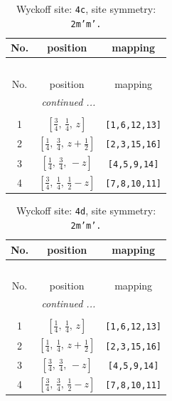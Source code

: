 \documentclass[fleqn,8pt]{jsarticle}
\begin{document}
\renewcommand{\arraystretch}{1.2}
\begin{longtable}{ccc}
\caption{Wyckoff site: {\tt 4c}, site symmetry: {\tt 2m'm'.}}
 \\
 \hline \hline
No. & position & mapping \\ \hline \endfirsthead

\multicolumn{2}{l}{\tablename\ \thetable{}} \\
 \hline \hline
No. & position & mapping \\ \hline \endhead

 \hline \hline
\multicolumn{2}{r}{\footnotesize\it continued ...} \\ \endfoot

 \hline \hline
\multicolumn{2}{r}{} \\ \endlastfoot

1 & $\left[ \frac{3}{4},\, \frac{1}{4},\, z \right]$ & {\tt [1,6,12,13]} \\ \hline
2 & $\left[ \frac{1}{4},\, \frac{3}{4},\, z + \frac{1}{2} \right]$ & {\tt [2,3,15,16]} \\ \hline
3 & $\left[ \frac{1}{4},\, \frac{3}{4},\, - z \right]$ & {\tt [4,5,9,14]} \\ \hline
4 & $\left[ \frac{3}{4},\, \frac{1}{4},\, \frac{1}{2} - z \right]$ & {\tt [7,8,10,11]} \\
\end{longtable}
\renewcommand{\arraystretch}{1.2}
\begin{longtable}{ccc}
\caption{Wyckoff site: {\tt 4d}, site symmetry: {\tt 2m'm'.}}
 \\
 \hline \hline
No. & position & mapping \\ \hline \endfirsthead

\multicolumn{2}{l}{\tablename\ \thetable{}} \\
 \hline \hline
No. & position & mapping \\ \hline \endhead

 \hline \hline
\multicolumn{2}{r}{\footnotesize\it continued ...} \\ \endfoot

 \hline \hline
\multicolumn{2}{r}{} \\ \endlastfoot

1 & $\left[ \frac{1}{4},\, \frac{1}{4},\, z \right]$ & {\tt [1,6,12,13]} \\ \hline
2 & $\left[ \frac{1}{4},\, \frac{1}{4},\, z + \frac{1}{2} \right]$ & {\tt [2,3,15,16]} \\ \hline
3 & $\left[ \frac{3}{4},\, \frac{3}{4},\, - z \right]$ & {\tt [4,5,9,14]} \\ \hline
4 & $\left[ \frac{3}{4},\, \frac{3}{4},\, \frac{1}{2} - z \right]$ & {\tt [7,8,10,11]} \\
\end{longtable}
\end{document}
